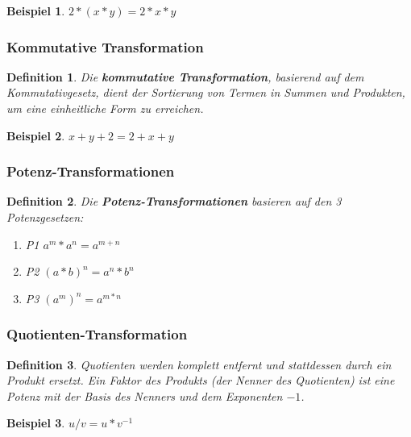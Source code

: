 \documentclass[11pt]{article}
\newtheorem{defin}{Definition}
\newtheorem{example}{Beispiel}
\begin{document}
\begin{example}
  $2*(x*y) = 2*x*y$
\end{example}

\subsubsection{Kommutative Transformation}

\begin{defin}
  \label{def:kommutative_transformation}
  Die \textbf{kommutative Transformation}, 
  basierend auf dem Kommutativgesetz, dient der Sortierung von Termen in Summen und Produkten, 
  um eine einheitliche Form zu erreichen.
\end{defin}

\begin{example}
  $x+y+2 = 2+x+y$
\end{example}

\subsubsection{Potenz-Transformationen}

\begin{defin}
  \label{def:potenz_transformation}
  Die \textbf{Potenz-Transformationen} basieren auf den 3 Potenzgesetzen:
  \begin{enumerate}
    \item P1 $a^m * a^n = a^{m+n}$
    \item P2 $(a*b)^n   = a^n * b^n$
    \item P3 $(a^m)^n   = a^{m*n}$
  \end{enumerate}
\end{defin}

\subsubsection{Quotienten-Transformation}

\begin{defin}
  \label{def:quotienten-transformation}
  Quotienten werden komplett entfernt und stattdessen durch ein Produkt ersetzt. 
  Ein Faktor des Produkts (der Nenner des Quotienten) ist eine Potenz mit der Basis des Nenners und dem Exponenten $-1$.
\end{defin}

\begin{example}
  $u/v = u * v^{-1}$
\end{example}
\end{document}

